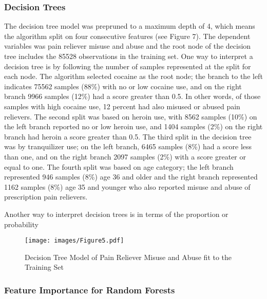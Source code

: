 \documentclass[sigconf]{acmart}
\begin{document}

\subsubsection{Decision Trees} 

The decision tree model was prepruned to a maximum 
depth of 4, which means the algorithm split on four consecutive features 
(see Figure 7). The dependent variables was pain reliever misuse and abuse 
and the root node of the decision tree includes the 85528 observations in 
the training set. One way to interpret a decision tree is by following the 
number of samples represented at the split for each node. The algorithm 
selected cocaine as the root node; the branch to the left indicates 75562 
samples (88\%) with no or low cocaine use, and on the right branch 9966 samples 
(12\%) had a score greater than 0.5. In other words, of those samples with 
high cocaine use, 12 percent had also misused or abused pain relievers. 
The second split was based on heroin use, with 8562 samples (10\%) on the 
left branch reported no or low heroin use, and 1404 samples (2\%) on the right 
branch had heroin a score greater than 0.5. The third split in the decision 
tree was by tranquilizer use; on the left branch, 6465 samples (8\%) had a 
score less than one, and on the right branch 2097 samples (2\%) with a score 
greater or equal to one. The fourth split was based on age category; the left 
branch represented 946 samples (8\%) age 36 and older and the right branch 
represented 1162 samples (8\%) age 35 and younger who also reported misuse 
and abuse of prescription pain relievers. 

Another way to interpret decision trees is in terms of the proportion or
probability



\begin{figure}[!ht]
  \centering\texttt{[image: images/Figure5.pdf]}
  \caption{Decision Tree Model of Pain Reliever Misuse and Abuse
  fit to the Training Set}
  \label{f:Figure5}
\end{figure}

\subsubsection{Feature Importance for Random Forests}
\end{document}
